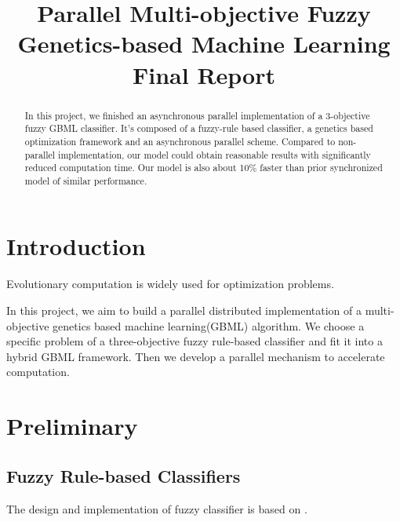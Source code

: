 \documentclass[conference]{IEEEtran}
\begin{document}
  
  \title{Parallel Multi-objective Fuzzy Genetics-based Machine Learning \\ Final Report}
  
  \author{
  }
  
  \maketitle
  
  \begin{abstract}
  In this project, we finished an asynchronous parallel implementation of a 3-objective fuzzy GBML classifier. It's composed of a fuzzy-rule based classifier, a genetics based optimization framework and an asynchronous parallel scheme. Compared to non-parallel implementation, our model could obtain reasonable results with significantly reduced computation time. Our model is also about 10\% faster than prior synchronized model of similar performance.
  \end{abstract}
  \IEEEpeerreviewmaketitle
  
  \section{Introduction}
  Evolutionary computation is widely used for optimization problems. 
  
  In this project, we aim to build a parallel distributed implementation of a multi-objective genetics based machine learning(GBML) algorithm. We choose a specific problem of a three-objective fuzzy rule-based classifier and fit it into a hybrid GBML framework. Then we develop a parallel mechanism to accelerate computation.

  \section{Preliminary}
  \subsection{Fuzzy Rule-based Classifiers}
  The design and implementation of fuzzy classifier is based on \cite{ishibuchi2007analysis}.
\end{document}

